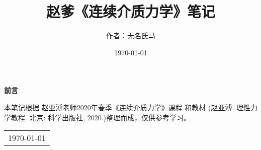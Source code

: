 \title{\Huge{\textbf{赵爹《连续介质力学》笔记}}}
\author{作者：无名氏马}
\date{\today}
\maketitle                   %

\thispagestyle{empty}        %
\begin{center}
    \Huge\textbf{前言}
\end{center}

    本笔记根据
    \href{https://www.bilibili.com/video/BV1c54y1W78q/?spm_id_from=333.1387.upload.video_card.click&vd_source=0745441b4a83ceba73d32af3b7b0a955}{赵亚溥老师2020年春季《连续介质力学》课程}
    和教材
    (赵亚溥. 理性力学教程. 北京: 科学出版社, 2020.)整理而成，仅供参考学习。

\begin{flushright}
    \begin{tabular}{c}
        \today
    \end{tabular}
\end{flushright}

\newpage                      %
\pagestyle{plain}             %
\setcounter{page}{1}          %
\tableofcontents              %

\newpage                      %
\pagestyle{plain}
\setcounter{page}{1}          %
